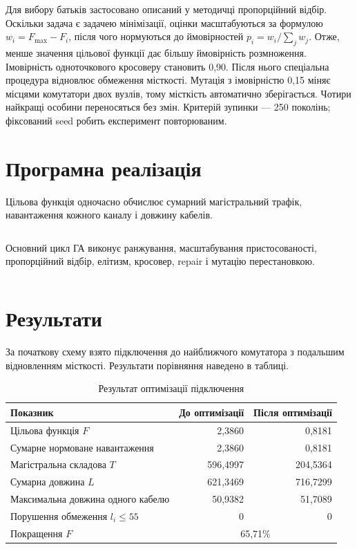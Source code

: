 \documentclass[12pt,a4paper]{article}
\begin{document}
Для вибору батьків застосовано описаний у методичці пропорційний відбір. Оскільки задача є задачею мінімізації, оцінки масштабуються за формулою $w_i=F_{\max}-F_i$, після чого нормуються до ймовірностей $p_i=w_i/\sum_jw_j$. Отже, менше значення цільової функції дає більшу ймовірність розмноження. Імовірність одноточкового кросоверу становить 0,90. Після нього спеціальна процедура відновлює обмеження місткості. Мутація з імовірністю 0,15 міняє місцями комутатори двох вузлів, тому місткість автоматично зберігається. Чотири найкращі особини переносяться без змін. Критерій зупинки --- 250 поколінь; фіксований seed робить експеримент повторюваним.

\section{Програмна реалізація}
Цільова функція одночасно обчислює сумарний магістральний трафік, навантаження кожного каналу і довжину кабелів.
\begin{listing}[H]
\inputminted[firstline=42,lastline=70]{python}{../src/main.py}
\caption{Відновлення допустимої хромосоми та оцінювання підключення}
\end{listing}

Основний цикл ГА виконує ранжування, масштабування пристосованості, пропорційний відбір, елітизм, кросовер, repair і мутацію перестановкою.
\begin{listing}[H]
\inputminted[firstline=79,lastline=111]{python}{../src/main.py}
\caption{Генетична оптимізація мережі}
\end{listing}

\section{Результати}
За початкову схему взято підключення до найближчого комутатора з подальшим відновленням місткості. Результати порівняння наведено в таблиці.
\begin{table}[H]\centering
\begin{tabular}{lrr}\toprule Показник & До оптимізації & Після оптимізації\\\midrule
Цільова функція $F$ & 2,3860 & 0,8181\\
Сумарне нормоване навантаження & 2,3860 & 0,8181\\
Магістральна складова $T$ & 596,4997 & 204,5364\\
Сумарна довжина $L$ & 621,3469 & 716,7299\\
Максимальна довжина одного кабелю & 50,9382 & 51,7089\\
Порушення обмеження $l_i\leq55$ & 0 & 0\\
Покращення $F$ & \multicolumn{2}{c}{65,71\%}\\\bottomrule
\end{tabular}\caption{Результат оптимізації підключення}\end{table}
\end{document}
